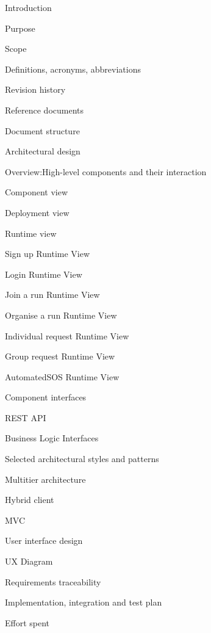 \documentclass{article}
\begin{document}
	\begin{legal}
 	\item Introduction
  		\begin{legal}
    		\item Purpose
		\item Scope
		\item Definitions, acronyms, abbreviations
		\item Revision history
		\item Reference documents
		\item Document structure	
  		\end{legal}
	\item Architectural design
  		\begin{legal}
    	\item Overview:High-level components and their interaction
		\item Component view
		\item Deployment view
		\item Runtime view
			\begin{legal}
			\item Sign up Runtime View
			\item Login Runtime View
			\item Join a run Runtime View
			\item Organise a run Runtime View
			\item Individual request Runtime View
			\item Group request Runtime View
			\item AutomatedSOS Runtime View
	  		\end{legal}
		\item Component interfaces
			\begin{legal}
			\item REST API
			\item Business Logic Interfaces
	  		\end{legal}
		\item Selected architectural styles and patterns
			\begin{legal}
			\item Multitier architecture
			\item Hybrid client
			\item MVC
	  		\end{legal}
  		\end{legal}
	\item User interface design
  		\begin{legal}
    		\item UX Diagram
  		\end{legal}
	\item Requirements traceability
	\item Implementation, integration and test plan
  	\item Effort spent
	\end{legal}
	
	\newpage
	\begin{legal}
	\item {}
	\newpage
	\item{}
	\newpage
	\item{}
	\newpage
	\item{}
	\newpage
	\item{}
	\newpage
	\item{}
	\end{legal}
\end{document}

